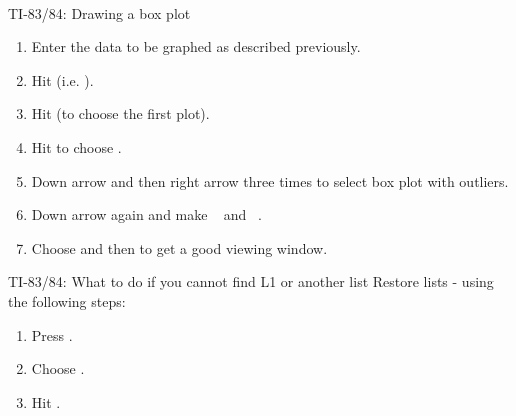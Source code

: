 \noindent \\

\begin{onebox}{ TI-83/84:  Drawing a box plot}
\label{boxplot}
\begin{enumerate}
\setlength{\itemsep}{0mm}
\item Enter the data to be graphed as described previously.
\item Hit   (i.e. ).
\item Hit  (to choose the first plot).
\item Hit  to choose .
\item Down arrow and then right arrow three times to select box plot with outliers.
\item Down arrow again and make ~ and ~.
\item Choose  and then  to get a good viewing window.
\end{enumerate}
\end{onebox}

\begin{onebox}{TI-83/84: What to do if you cannot find {L1} or another list}
Restore lists - using the following steps:
\begin{enumerate}
\setlength{\itemsep}{0mm}
\item Press .
\item Choose .
\item Hit .
\end{enumerate}\end{onebox}


